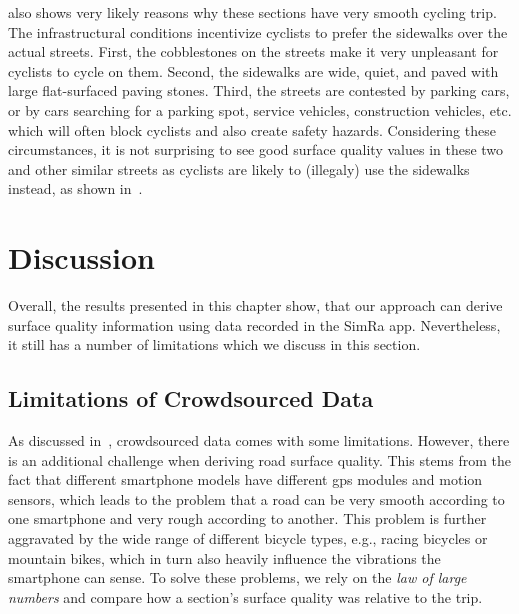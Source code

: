  also shows very likely reasons why these sections have very smooth cycling trip.
The infrastructural conditions incentivize cyclists to prefer the sidewalks over the actual streets.
First, the cobblestones on the streets make it very unpleasant for cyclists to cycle on them.
Second, the sidewalks are wide, quiet, and paved with large flat-surfaced paving stones.
Third, the streets are contested by parking cars, or by cars searching for a parking spot, service vehicles, construction vehicles, etc. which will often block cyclists and also create safety hazards.
Considering these circumstances, it is not surprising to see good surface quality values in these two and other similar streets as cyclists are likely to (illegaly) use the sidewalks instead, as shown in~.

\begin{table}%
\centering
\caption{Surface Quality Analysis Evaluation Results Showing Mean, Median and Standard Deviation of Sections With (Seemingly) Confusing Results}%
\label{tab:mismatch}
\end{table}

\section{Discussion}
\label{sec:discussion_cyclequality}
Overall, the results presented in this chapter show, that our approach can derive surface quality information using data recorded in the SimRa app.
Nevertheless, it still has a number of limitations which we discuss in this section.

\subsection{Limitations of Crowdsourced Data}
\label{subsec:limitation_of_crowdsourced_data}
As discussed in~, crowdsourced data comes with some limitations.
However, there is an additional challenge when deriving road surface quality.
This stems from the fact that different smartphone models have different \ac{gps} modules and motion sensors, which leads to the problem that a road can be very smooth according to one smartphone and very rough according to another.
This problem is further aggravated by the wide range of different bicycle types, e.g., racing bicycles or mountain bikes, which in turn also heavily influence the vibrations the smartphone can sense.
To solve these problems, we rely on the \textit{law of large numbers} and compare how a section's surface quality was relative to the trip. 

